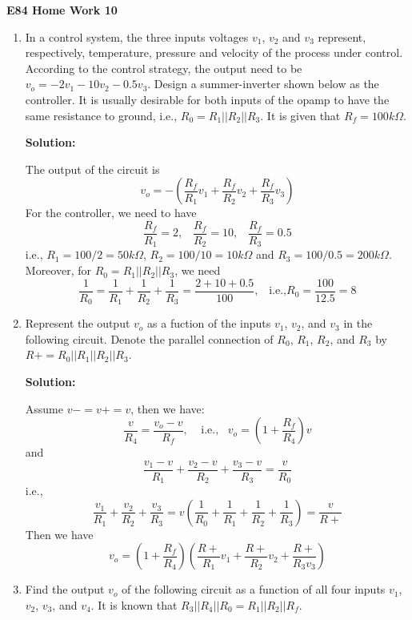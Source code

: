 \usepackage{html}

\begin{center}
{\Large \bf  E84 Home Work 10}
\end{center}
\begin{enumerate}

\item In a control system, the three inputs voltages $v_1$, $v_2$ 
and $v_3$ represent, respectively, temperature, pressure and velocity
of the process under control. According to the control strategy, the
output need to be $v_o=-2v_1-10v_2-0.5v_3$. Design a summer-inverter 
shown below as the controller.  It is usually desirable for both 
inputs of the opamp to have the same resistance to ground, i.e.,
$R_0=R_1||R_2||R_3$. It is given that $R_f=100k\Omega$.


{\bf Solution:}

The output of the circuit is
\[ v_o=-(\frac{R_f}{R_1}v_1+\frac{R_f}{R_2}v_2+\frac{R_f}{R_3}v_3) \]
For the controller, we need to have
\[	\frac{R_f}{R_1}=2,\;\;\;
	\frac{R_f}{R_2}=10,\;\;\;
	\frac{R_f}{R_3}=0.5	\]
i.e., $R_1=100/2=50k\Omega$, $R_2=100/10=10k\Omega$ and
$R_3=100/0.5=200k\Omega$. Moreover, for $R_0=R_1||R_2||R_3$, we need
\[ \frac{1}{R_0}=\frac{1}{R_1}+\frac{1}{R_2}+\frac{1}{R_3}
	=\frac{2+10+0.5}{100},\;\;\;\mbox{i.e.,}
	R_0=\frac{100}{12.5}=8	\]

\item Represent the output $v_o$ as a fuction of the inputs $v_1$, 
$v_2$, and $v_3$ in the following circuit. Denote the parallel 
connection of $R_0$, $R_1$, $R_2$, and $R_3$ by $R+=R_0||R_1||R_2||R_3$.


{\bf Solution:} 

Assume $v-=v+=v$, then we have:
\[ \frac{v}{R_4}=\frac{v_o-v}{R_f},\;\;\;\;\mbox{i.e.,}\;\;\;
	v_o=(1+\frac{R_f}{R_4}) v	\]
and
\[ \frac{v_1-v}{R_1}+\frac{v_2-v}{R_2}+\frac{v_3-v}{R_3}=\frac{v}{R_0} \]
i.e.,
\[ \frac{v_1}{R_1}+\frac{v_2}{R_2}+\frac{v_3}{R_3}
	=v(\frac{1}{R_0}+\frac{1}{R_1}+\frac{1}{R_2}+\frac{1}{R_3})
	=\frac{v}{R+}	\]
Then we have
\[	v_o=(1+\frac{R_f}{R_4})(\frac{R+}{R_1}v_1+\frac{R+}{R_2}v_2
	+\frac{R+}{R_3v_3})	\]

\item Find the output $v_o$ of the following circuit as a function 
of all four inputs $v_1$, $v_2$, $v_3$, and $v_4$. It is known that
$R_3 || R_4 || R_0=R_1 || R_2 || R_f$.


\end{enumerate}
